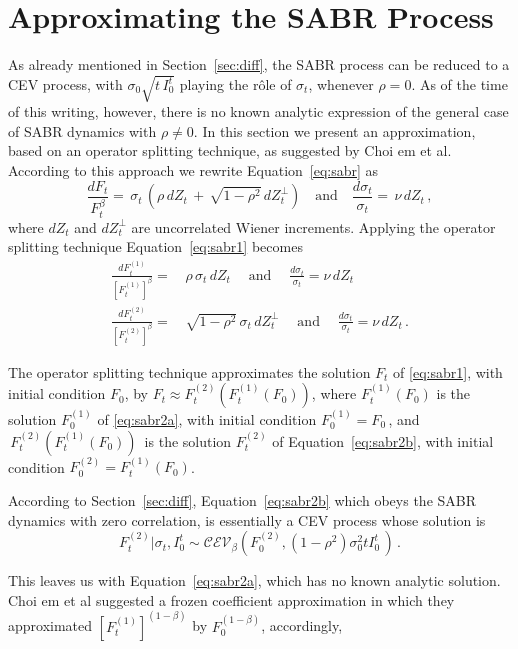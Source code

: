 \documentclass[12pt,oneside]{article}
\newcommand{\beqn}{\begin{equation}}
\newcommand{\eeqn}{\end{equation}}
\numberwithin{equation}{section}
\begin{document}
\section{Approximating the SABR Process}
\label{sec:approx}
As already mentioned in Section~\ref{sec:diff}, the SABR process can be
reduced to a CEV process, with $\sigma_0\sqrt{t\,I_0^t}$ playing the
r\^ole of $\sigma_t$, whenever $\rho=0$.
As of the time of this writing, however, there is no known analytic expression
of the general case of SABR dynamics with $\rho\ne 0$.
In this section we present an approximation,
based on an operator splitting technique,
as suggested by Choi {em et al}\cite{CHK}.
According to this approach we rewrite Equation~\eqref{eq:sabr} as
\beqn\label{eq:sabr1}
\frac{dF_t}{F_t^\beta}=\,\sigma_t\,(\rho\,dZ_t \,+\,\sqrt{1-\rho^2}\,dZ_t^\perp)\quad
\text{and}\quad\frac{d\sigma_t}{\sigma_t}=\,\nu\,dZ_t\,,
\eeqn
where $dZ_t$ and $dZ_t^\perp$ are uncorrelated Wiener increments.
Applying the operator splitting technique Equation~\eqref{eq:sabr1} becomes
\begin{subequations}
\begin{align}
\frac{dF_t^{(1)}}{[F_t^{(1)}]^\beta}=&\,\rho\,\sigma_t\,dZ_t\;\quad\text{and}\;\quad
\frac{d\sigma_t}{\sigma_t}=\nu\,dZ_t\label{eq:sabr2a}\\[5pt]
\frac{dF_t^{(2)}}{[F_t^{(2)}]^\beta}=&\,\sqrt{1-\rho^2}\,\sigma_t\,dZ_t^\perp\;\quad\text{and}\quad
\;\frac{d\sigma_t}{\sigma_t}=\nu\,dZ_t\label{eq:sabr2b}\,.
\end{align}
\end{subequations}

The operator splitting technique approximates the solution $F_t$ of \eqref{eq:sabr1},
with initial condition $F_0$,
by $F_t\!\approx\!\! F_t^{(2)}\!\left(F_t^{(1)}(F_0)\right)$, where
$F_t^{(1)}(F_0)$ is the solution $F_0^{(1)}$ of \eqref{eq:sabr2a},
with initial condition $F_0^{(1)}\!\!=\!\!F_0\,$,
and $\,F_t^{(2)}(F_t^{(1)}(F_0))\,$ is the solution $F_t^{(2)}$ of Equation~\eqref{eq:sabr2b},
with initial condition $F_0^{(2)}\!=\!F_t^{(1)}(F_0)$.

According to Section~\ref{sec:diff}, Equation~\eqref{eq:sabr2b} which obeys the
SABR dynamics with zero correlation, is essentially a CEV process whose solution is
\beqn
F_t^{(2)}|\sigma_t,I_0^t\sim \mathcal{CEV}_\beta\left(F_0^{(2)},(1-\rho^2)\sigma_0^2 tI_0^t\,\right)\,.
\eeqn 

This leaves us with Equation~\eqref{eq:sabr2a}, which has no known analytic solution.
Choi {em et al}\cite{CHK} suggested a frozen coefficient approximation in which
they approximated $[F_t^{(1)}]^{(1-\beta)}$ by $F_0^{(1-\beta)}$,
accordingly,
\end{document}
